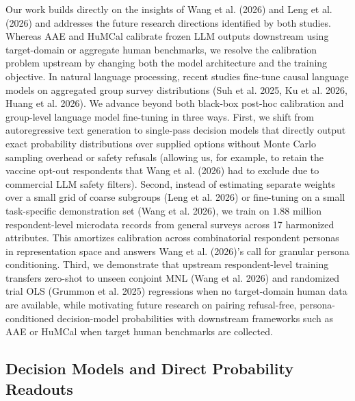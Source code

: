 \documentclass[
  letterpaper,
  DIV=11,
  numbers=noendperiod]{scrartcl}
\begin{document}
Our work builds directly on the insights of Wang et al. (2026) and Leng
et al. (2026) and addresses the future research directions identified by
both studies. Whereas AAE and HuMCal calibrate frozen LLM outputs
downstream using target-domain or aggregate human benchmarks, we resolve
the calibration problem upstream by changing both the model architecture
and the training objective. In natural language processing, recent
studies fine-tune causal language models on aggregated group survey
distributions (Suh et al. 2025, Ku et al. 2026, Huang et al. 2026). We
advance beyond both black-box post-hoc calibration and group-level
language model fine-tuning in three ways. First, we shift from
autoregressive text generation to single-pass decision models that
directly output exact probability distributions over supplied options
without Monte Carlo sampling overhead or safety refusals (allowing us,
for example, to retain the vaccine opt-out respondents that Wang et al.
(2026) had to exclude due to commercial LLM safety filters). Second,
instead of estimating separate weights over a small grid of coarse
subgroups (Leng et al. 2026) or fine-tuning on a small task-specific
demonstration set (Wang et al. 2026), we train on \(1.88\) million
respondent-level microdata records from general surveys across 17
harmonized attributes. This amortizes calibration across combinatorial
respondent personas in representation space and answers Wang et al.
(2026)'s call for granular persona conditioning. Third, we demonstrate
that upstream respondent-level training transfers zero-shot to unseen
conjoint MNL (Wang et al. 2026) and randomized trial OLS (Grummon et al.
2025) regressions when no target-domain human data are available, while
motivating future research on pairing refusal-free, persona-conditioned
decision-model probabilities with downstream frameworks such as AAE or
HuMCal when target human benchmarks are collected.

\subsection{Decision Models and Direct Probability
Readouts}\label{decision-models-and-direct-probability-readouts}
\end{document}
